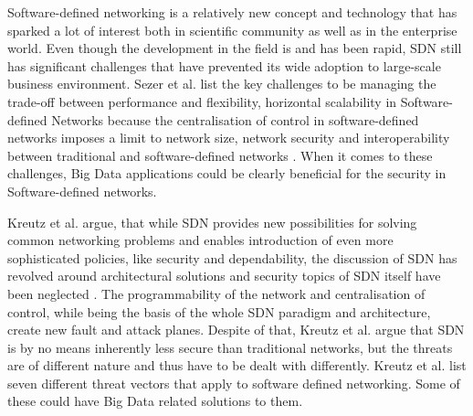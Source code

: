 \documentclass{acm_proc_article-sp}
\begin{document}
Software-defined networking is a relatively new concept and technology that has sparked a lot of interest both in scientific community as well as in the enterprise world. Even though the development in the field is and has been rapid, SDN still has significant challenges that have prevented its wide adoption to large-scale business environment. Sezer et al. list the key challenges to be managing the trade-off between performance and flexibility, horizontal scalability in Software-defined Networks because the centralisation of control in software-defined networks imposes a limit to network size, network security and interoperability between traditional and software-defined networks \cite{sezer2013we}. When it comes to these challenges, Big Data applications could be clearly beneficial for the security in Software-defined networks.

Kreutz et al. argue, that while SDN provides new possibilities for solving common networking problems and enables introduction of even more sophisticated policies, like security and dependability, the discussion of SDN has revolved around architectural solutions and security topics of SDN itself have been neglected  \cite{Kreutz13}. The programmability of the network and centralisation of control, while being the basis of the whole SDN paradigm and architecture, create new fault and attack planes. Despite of that, Kreutz et al. argue that SDN is by no means inherently less secure than traditional networks, but the threats are of different nature and thus have to be dealt with differently.
Kreutz et al. list seven different threat vectors that apply to software defined networking. Some of these could have Big Data related solutions to them.
\end{document}
